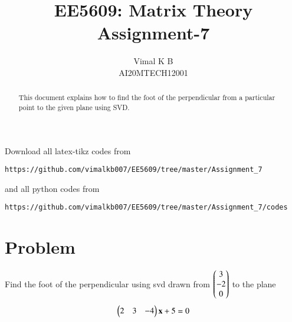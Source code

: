 \documentclass[journal,12pt,twocolumn]{IEEEtran}
\begin{document}
\makeatletter
{}
\makeatother
\let\StandardTheFigure\thefigure
\let\vec\mathbf
\renewcommand{\thefigure}{\theproblem}
\def\putbox#1#2#3{\makebox[0in][l]{\makebox[#1][l]{}\raisebox{\baselineskip}[0in][0in]{\raisebox{#2}[0in][0in]{#3}}}}
     \def\rightbox#1{\makebox[0in][r]{#1}}
     \def\centbox#1{\makebox[0in]{#1}}
     \def\topbox#1{\raisebox{-\baselineskip}[0in][0in]{#1}}
     \def\midbox#1{\raisebox{-0.5\baselineskip}[0in][0in]{#1}}
\vspace{3cm}
\title{EE5609: Matrix Theory\\
          Assignment-7\\}
\author{Vimal K B\\
AI20MTECH12001 }
\maketitle
\newpage
\bigskip
\renewcommand{\thefigure}{\theenumi}
\renewcommand{\thetable}{\theenumi}
\begin{abstract}
This document explains how to find the foot of the perpendicular from a particular point to the given plane using SVD.
\end{abstract}
Download all latex-tikz codes from 
%
\begin{lstlisting}
https://github.com/vimalkb007/EE5609/tree/master/Assignment_7
\end{lstlisting}
and all python codes from 
\begin{lstlisting}
https://github.com/vimalkb007/EE5609/tree/master/Assignment_7/codes
\end{lstlisting}
%
\section{Problem}
Find the foot of the perpendicular using svd drawn from $\begin{pmatrix}3\\-2\\0\end{pmatrix}$ to the plane
 \begin{align}
 \myvec{2&3&-4}\vec{x}+5=0
 \end{align}
\end{document}
